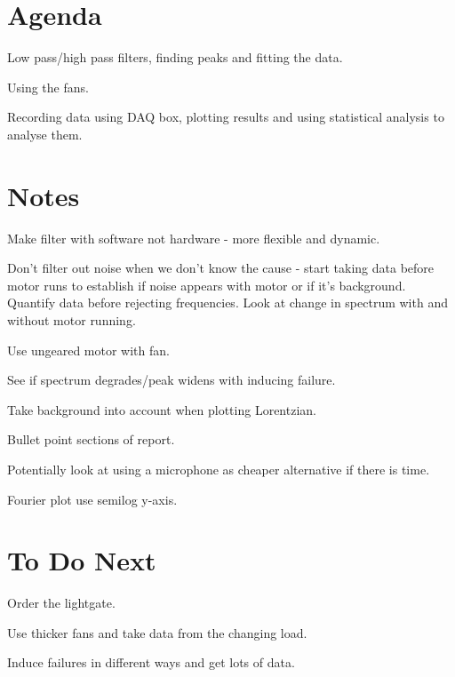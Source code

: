 \documentclass[11pt]{meetingmins}
\begin{document}
\maketitle


\section{Agenda}
\begin{items}
\item
Low pass/high pass filters, finding peaks and fitting the data.

\item
Using the fans.

\item
Recording data using DAQ box, plotting results and using statistical analysis to analyse them.
\end{items}

\section{Notes}
\begin{items}
\item
Make filter with software not hardware - more flexible and dynamic.

\item
Don't filter out noise when we don't know the cause - start taking data before motor runs to establish if noise appears with motor or if it's background. Quantify data before rejecting frequencies. Look at change in spectrum with and without motor running.

\item
Use ungeared motor with fan.

\item
See if spectrum degrades/peak widens with inducing failure.

\item
Take background into account when plotting Lorentzian.

\item
Bullet point sections of report.

\item
Potentially look at using a microphone as cheaper alternative if there is time.

\item
Fourier plot use semilog y-axis.
\end{items}


\section{To Do Next}
\begin{items}
\item
Order the lightgate.

\item
Use thicker fans and take data from the changing load.

\item
Induce failures in different ways and get lots of data.
\end{items}
\end{document}
